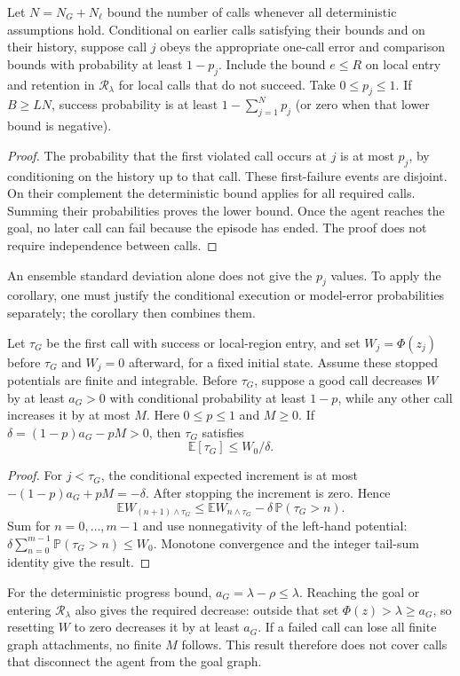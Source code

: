 \documentclass{article} %
\newcommand{\Rset}{\mathcal R_\lambda}
\newcommand{\EE}{\mathbb E}
\newcommand{\PP}{\mathbb P}
\theoremstyle{definition}
\theoremstyle{remark}
\begin{document}
\begin{corollary}
\label{cor:high-prob}
Let $N=N_G+N_\ell$ bound the number of calls whenever all deterministic assumptions hold.
Conditional on earlier calls satisfying their bounds and on their history, suppose
call $j$ obeys the appropriate one-call error and comparison bounds with probability
at least $1-p_j$. Include the bound $e\le R$ on local entry and retention in $\Rset$
for local calls that do not succeed. Take $0\le p_j\le1$.
If $B\ge LN$, success probability is at least
$1-\sum_{j=1}^{N}p_j$ (or zero when that lower bound is negative).
\end{corollary}
\begin{proof}
The probability that the first violated call occurs at $j$ is at most $p_j$,
by conditioning on the history up to that call.
These first-failure events are disjoint. On their complement the deterministic
bound applies for all required calls. Summing their probabilities proves
the lower bound. Once the agent reaches the goal, no later call can fail because the
episode has ended. The proof does not require independence between calls.
\end{proof}
An ensemble standard deviation alone does not give the $p_j$ values.
To apply the corollary, one must justify the conditional execution or model-error
probabilities separately; the corollary then combines them.

\begin{proposition}
\label{prop:drift}
Let $\tau_G$ be the first call with success or local-region entry, and set
$W_j=\Phi(z_j)$ before $\tau_G$ and $W_j=0$ afterward, for a fixed initial state.
Assume these stopped potentials are finite and integrable.
Before $\tau_G$, suppose a good call decreases $W$ by at least $a_G>0$ with conditional
probability at least $1-p$, while any other call increases it by at most $M$.
Here $0\le p\le1$ and $M\ge0$.
If $\delta=(1-p)a_G-pM>0$, then $\tau_G$ satisfies
\[
 \EE[\tau_G]\le W_0/\delta.
\]
\end{proposition}
\begin{proof}
For $j<\tau_G$, the conditional expected increment is at most
$-(1-p)a_G+pM=-\delta$. After stopping the increment is zero. Hence
\[
 \EE W_{(n+1)\wedge\tau_G}
 \le \EE W_{n\wedge\tau_G}-\delta\,\PP(\tau_G>n).
\]
Sum for $n=0,\ldots,m-1$ and use nonnegativity of the left-hand potential:
$\delta\sum_{n=0}^{m-1}\PP(\tau_G>n)\le W_0$.
Monotone convergence and the integer tail-sum identity give the result.
\end{proof}
For the deterministic progress bound, $a_G=\lambda-\rho\le\lambda$.
Reaching the goal or entering $\Rset$ also gives the required decrease: outside that set
$\Phi(z)>\lambda\ge a_G$, so resetting $W$ to zero decreases it by at least $a_G$.
If a failed call can lose all finite graph attachments, no finite $M$ follows.
This result therefore does not cover calls that disconnect the agent from the goal graph.
\end{document}
